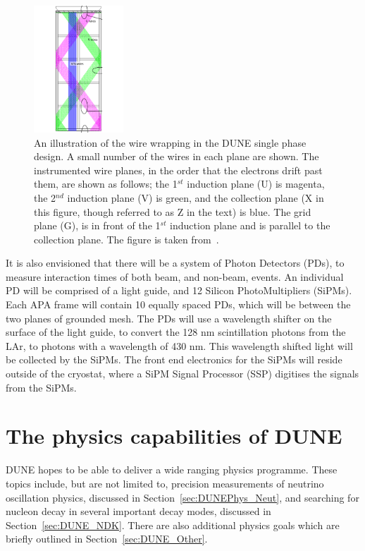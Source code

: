 \begin{figure}
  \centering
  \includegraphics[width=0.3\textwidth]{tpc_apa_cross_sections}
  \caption[An illustration of the wire wrapping in the DUNE single phase design]
          {An illustration of the wire wrapping in the DUNE single phase design. A small number of the wires in each plane are shown. The instrumented wire planes, in the order that the electrons drift past them, are shown as follows; the 1$^{st}$ induction plane (U) is magenta, the 2$^{nd}$ induction plane (V) is green, and the collection plane (X in this figure, though referred to as Z in the text) is blue. The grid plane (G), is in front of the 1$^{st}$ induction plane and is parallel to the collection plane. The figure is taken from~\citep{DUNECDR_V4}.}  
  \label{fig:FDWireWrap}
\end{figure}

It is also envisioned that there will be a system of Photon Detectors (PDs), to measure interaction times of both beam, and non-beam, events. An individual PD will be comprised of a light guide, and 12 Silicon PhotoMultipliers (SiPMs). Each APA frame will contain 10 equally spaced PDs, which will be between the two planes of grounded mesh. The PDs will use a wavelength shifter on the surface of the light guide, to convert the 128 nm scintillation photons from the LAr, to photons with a wavelength of 430 nm. This wavelength shifted light will be collected by the SiPMs. The front end electronics for the SiPMs will reside outside of the cryostat, where a SiPM Signal Processor (SSP) digitises the signals from the SiPMs. \\

\section{The physics capabilities of DUNE} \label{sec:DUNEPhys}%
DUNE hopes to be able to deliver a wide ranging physics programme. These topics include, but are not limited to, precision measurements of neutrino oscillation physics, discussed in Section~\ref{sec:DUNEPhys_Neut}, and searching for nucleon decay in several important decay modes, discussed in Section~\ref{sec:DUNE_NDK}. There are also additional physics goals which are briefly outlined in Section~\ref{sec:DUNE_Other}. \\


